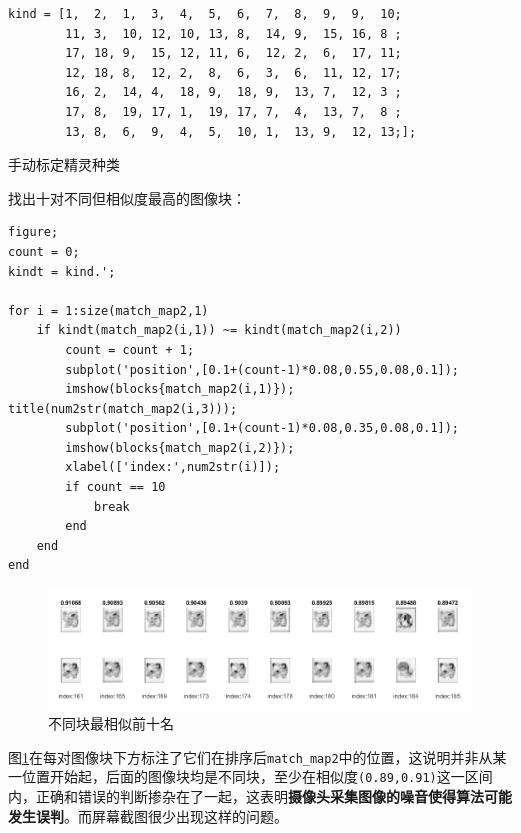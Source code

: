 \documentclass{article}
\numberwithin{figure}{section}
\numberwithin{table}{section}
\numberwithin{listing}{section}
\numberwithin{equation}{section}
\begin{document}
\begin{enumerate}
                \begin{listing}[H]
                    \begin{verbatim}
kind = [1,  2,  1,  3,  4,  5,  6,  7,  8,  9,  9,  10;
        11, 3,  10, 12, 10, 13, 8,  14, 9,  15, 16, 8 ;
        17, 18, 9,  15, 12, 11, 6,  12, 2,  6,  17, 11;
        12, 18, 8,  12, 2,  8,  6,  3,  6,  11, 12, 17;
        16, 2,  14, 4,  18, 9,  18, 9,  13, 7,  12, 3 ;
        17, 8,  19, 17, 1,  19, 17, 7,  4,  13, 7,  8 ;
        13, 8,  6,  9,  4,  5,  10, 1,  13, 9,  12, 13;];
                    \end{verbatim}
                    \caption{手动标定精灵种类}
                    \label{code:classify_manually}
                \end{listing}

                找出十对不同但相似度最高的图像块：

                \begin{verbatim}
figure;
count = 0;
kindt = kind.';

for i = 1:size(match_map2,1)
    if kindt(match_map2(i,1)) ~= kindt(match_map2(i,2))
        count = count + 1;
        subplot('position',[0.1+(count-1)*0.08,0.55,0.08,0.1]);
        imshow(blocks{match_map2(i,1)}); title(num2str(match_map2(i,3)));
        subplot('position',[0.1+(count-1)*0.08,0.35,0.08,0.1]);
        imshow(blocks{match_map2(i,2)});
        xlabel(['index:',num2str(i)]);
        if count == 10
            break
        end
    end
end
                \end{verbatim}

                \begin{figure}[H]
                    \centering
                    \includegraphics[width=\textwidth]{mistakes10}
                    \caption{不同块最相似前十名}
                    \label{fig:mistakes10}
                \end{figure}

                图\ref{fig:mistakes10}在每对图像块下方标注了它们在排序后\texttt{match\_map2}中的位置，这说明并非从某一位置开始起，后面的图像块均是不同块，至少在相似度\texttt{(0.89,0.91)}这一区间内，正确和错误的判断掺杂在了一起，这表明\textbf{摄像头采集图像的噪音使得算法可能发生误判}。而屏幕截图很少出现这样的问题。


\end{enumerate}
\end{document}
